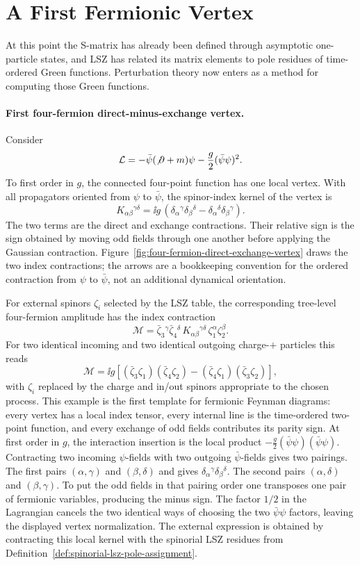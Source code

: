 \section{A First Fermionic Vertex}

At this point the S-matrix has already been defined through asymptotic
one-particle states, and LSZ has related its matrix elements to pole
residues of time-ordered Green functions. Perturbation theory now enters as a
method for computing those Green functions.

\paragraph{First four-fermion direct-minus-exchange vertex.}
Consider
\[
  \mathcal L
  =
  -\bar\psi(\not\partial+m)\psi
  -
  \frac g2(\bar\psi\psi)^2 .
\]
To first order in \(g\), the connected four-point function has one local
vertex. With all propagators oriented from \(\psi\) to \(\bar\psi\), the
spinor-index kernel of the vertex is
\[
  K_{\alpha\beta}{}^{\gamma\delta}
  =
  \ii g\,
  \left(
    \delta_\alpha{}^\gamma\delta_\beta{}^\delta
    -
    \delta_\alpha{}^\delta\delta_\beta{}^\gamma
  \right).
\]
The two terms are the direct and exchange contractions. Their relative sign
is the sign obtained by moving odd fields through one another before applying
the Gaussian contraction.  Figure~\ref{fig:four-fermion-direct-exchange-vertex}
draws the two index contractions; the arrows are a bookkeeping convention for
the ordered contraction from \(\psi\) to \(\bar\psi\), not an additional
dynamical orientation.

For external spinors \(\zeta_i\) selected by the LSZ table, the corresponding
tree-level four-fermion amplitude has the index contraction
\[
  \mathcal M
  =
  \bar\zeta_3{}^\gamma\bar\zeta_4{}^\delta\,
  K_{\alpha\beta}{}^{\gamma\delta}\,
  \zeta_1^\alpha\zeta_2^\beta .
\]
For two identical incoming and two identical outgoing charge-\(+\) particles
this reads
\[
  \mathcal M
  =
  \ii g
  \left[
    (\bar\zeta_3\zeta_1)(\bar\zeta_4\zeta_2)
    -
    (\bar\zeta_4\zeta_1)(\bar\zeta_3\zeta_2)
  \right],
\]
with \(\zeta_i\) replaced by the charge and in/out spinors appropriate to the
chosen process. This example is the first template for fermionic
Feynman diagrams: every vertex has a local index tensor, every internal line
is the time-ordered two-point function, and every exchange of odd fields
contributes its parity sign.
At first order in \(g\), the interaction insertion is the local product
\(-\frac g2(\bar\psi\psi)(\bar\psi\psi)\).  Contracting two incoming
\(\psi\)-fields with two outgoing \(\bar\psi\)-fields gives two pairings.
The first pairs \((\alpha,\gamma)\) and \((\beta,\delta)\) and gives
\(\delta_\alpha{}^\gamma\delta_\beta{}^\delta\).  The second pairs
\((\alpha,\delta)\) and \((\beta,\gamma)\).  To put the odd fields in that
pairing order one transposes one pair of fermionic variables, producing the
minus sign.  The factor \(1/2\) in the Lagrangian cancels the two identical
ways of choosing the two \(\bar\psi\psi\) factors, leaving the displayed
vertex normalization.  The external expression is obtained by contracting
this local kernel with the spinorial LSZ residues from
Definition~\ref{def:spinorial-lsz-pole-assignment}.

